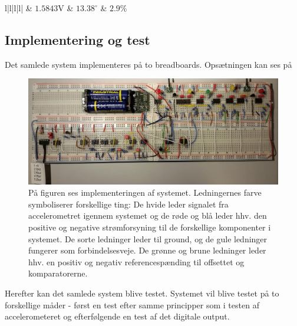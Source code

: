 \begin{table}[H]
\begin{tabular}{l|l|l|l|}
		               & $1.5843$V                                                                   & $13.38^{\circ}$                                                              & $2.9\%$                                                    \\ \hline
	\end{tabular}
	\caption{I tabellen ses resultatet af det simulerede samlede system ved aktivering af de enkelte feedbackkomponenter og den procentvise afvigelse fra de definerede hældningsgrader.}
	\label{tab:samlet_sim}
\end{table}

\subsection{Implementering og test}
Det samlede system implementeres på to breadboards. Opsætningen kan ses på 
\begin{figure}[H]
	\centering
	\includegraphics[scale=.22]{figures/cProblemloesning/Samlet_system2.jpg}
	\caption{På figuren ses implementeringen af systemet. Ledningernes farve symboliserer forskellige ting: De hvide leder signalet fra accelerometret igennem systemet og de røde og blå leder hhv. den positive og negative strømforsyning til de forskellige komponenter i systemet. De sorte ledninger leder til ground, og de gule ledninger fungerer som forbindelsesveje. De grønne og brune ledninger leder hhv. en positiv og negativ referencespænding til offsettet og komparatorerne.}
	\label{fig:samlet_system_real}
\end{figure}
\noindent Herefter kan det samlede system blive testet. Systemet vil blive testet på to forskellige måder - først en test efter samme principper som i testen af accelerometeret og efterfølgende en test af det digitale output. \\

